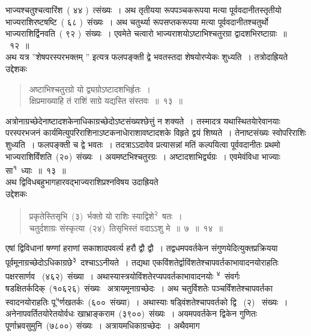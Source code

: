 \documentclass[11pt, openany]{book}
\begin{document}
\newpage
\thispagestyle{fancy}
\fancyhf{}
\noindent
भाज्यश्चतुश्चत्वारिंश~( ४४ )~त्संख्यः~। अथ तृतीयया रूपपञ्चकरूपया मत्या
पूर्ववदानीतस्तृतीयो भाज्यराशिरष्टषष्टि~( ६८ )~संख्यः~। अथ चतुर्थ्या रूपसप्तकरूपया मत्या पूर्ववदानीतश्चतुर्थो भाज्यराशिर्द्विनवति~( ९२ )~संख्यः~। एवमेते चत्वारो भाज्यराशयोऽष्टाभिश्चतुरग्रा द्वादशभिरष्टाग्राः~॥~१२~॥\\
\indent
अथ यत्र ''शेषपरस्परभक्तम् '' इत्यत्र फलपङ्क्ती द्वे भवतस्तदा शेषयोरप्येकः शुध्यति~। तत्रोदाह्रियते \textendash\\
उद्देशकः\textendash
\begin{quote}
{\ku
अष्टाभिश्चतुरग्रो यो द्व्यग्रोऽष्टादशभिर्हृतः~।\\
क्षिप्रमाख्याहि तं राशिं साग्रे यद्यस्ति संस्तवः~॥~१३~॥}
\end{quote}

\indent
अत्रोनाग्रच्छेदेनाष्टादशकेनाधिकाग्रच्छेदोऽष्टसंख्यश्छेत्तुं न शक्यते~।
तस्मादत्र यथास्थितयाेरेवानयाः परस्परभजनं कार्यमित्युपरिराशिनाऽष्टकनाधाेराशावष्टादशके विहृते द्वयं शिष्यते~। तेनाष्टसंख्यः स्वोपरिराशिः शुध्यति~। फलपङ्क्ती च द्वे भवतः~। तदत्राऽऽदावेव प्रत्यासन्नां मतिं
कल्पयित्वा पूर्ववदानीतः प्रथमो भाज्यराशिर्विंशति~(२०)~संख्यः~। अयमष्टभिश्चतुरग्रः~।
अष्टादशाभिर्द्व्यग्रः~। एवमेवंविधा भाज्याः सा\textsuperscript{१}\ ध्याः~॥~१३~॥\\

\indent
अथ द्विविधबहुभागहारवद्भाज्यराशिप्रश्नविषय उदाह्रियते \textendash\\
उद्देशकः \textendash
\begin{quote}
{\ku
प्रकृतेस्तिसृभि~(३)~र्भक्तो यो राशिः स्याद्विशे\textsuperscript{२}\ षतः~।\\
चतुर्दशाग्रः संस्कृत्या~(२४)~तिसृभिस्तं वदाऽऽशु मे~॥~७~॥~१४~॥}
\end{quote}

\indent
एषां द्विविधानां षण्णां हराणां सकाशादपवर्त्य हरौ द्वौ द्वौ~। तद्वधमपवर्तकेन संगुणयेदित्युक्तप्रक्रियया पूर्वमूनाग्रच्छेदोऽधिकाग्रछे\textsuperscript{३}\ दश्चाऽऽनीयते~। तद्यथा एकविंशतेर्द्वाविंशतेश्चापवर्तकाभावादनयोराहतिः पक्षरसार्णव
~(४६२)~संख्या~। अथास्यास्त्रयोविंशतेरप्यपवर्तकाभावादनयोः \textsuperscript{४}\ संवर्गः षडक्षितर्कदिक्~(१०६२६)~संख्यः~ अत्रायमूनाग्रच्छेदः~।  अथ चतुर्विशतेः पञ्चर्विंशतेश्चापवर्तका स्वादनयोराहतिः पू\textsuperscript{५}र्णखतर्कः~(६००~संख्या)~। अथास्याः षड्विंशतेश्चापवर्तको द्वि ~(२)~ संख्यः~।अनेनापवर्तितयोरेतयोर्वधः खाभ्राङ्कराम~(३९००)~संख्यः~। अयमपवर्तकेन द्विकेन गुणितः पूर्णाभ्रवसुमुनि~(७८००)~संख्यः~। अत्रायमधिकाग्रच्छेदः~। अथैवमाग \textendash
\end{document}
